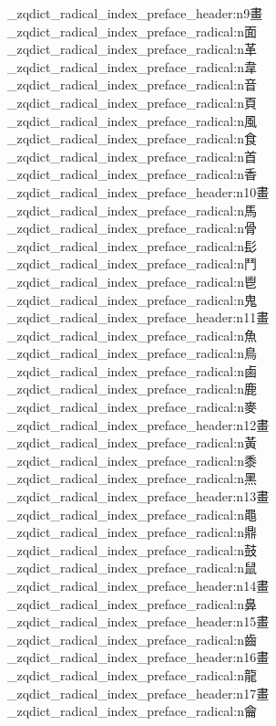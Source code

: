 {\begin{multicols}{5}
  \_zqdict_radical_index_preface_header:n{9畫}
  \_zqdict_radical_index_preface_radical:n{面}
  \_zqdict_radical_index_preface_radical:n{革}
  \_zqdict_radical_index_preface_radical:n{韋}
  \_zqdict_radical_index_preface_radical:n{音}
  \_zqdict_radical_index_preface_radical:n{頁}
  \_zqdict_radical_index_preface_radical:n{風}
  \_zqdict_radical_index_preface_radical:n{食}
  \_zqdict_radical_index_preface_radical:n{首}
  \_zqdict_radical_index_preface_radical:n{香}
  \_zqdict_radical_index_preface_header:n{10畫}
  \_zqdict_radical_index_preface_radical:n{馬}
  \_zqdict_radical_index_preface_radical:n{骨}
  \_zqdict_radical_index_preface_radical:n{髟}
  \_zqdict_radical_index_preface_radical:n{鬥}
  \_zqdict_radical_index_preface_radical:n{鬯}
  \_zqdict_radical_index_preface_radical:n{鬼}
  \_zqdict_radical_index_preface_header:n{11畫}
  \_zqdict_radical_index_preface_radical:n{魚}
  \_zqdict_radical_index_preface_radical:n{鳥}
  \_zqdict_radical_index_preface_radical:n{鹵}
  \_zqdict_radical_index_preface_radical:n{鹿}
  \_zqdict_radical_index_preface_radical:n{麥}
  \_zqdict_radical_index_preface_header:n{12畫}
  \_zqdict_radical_index_preface_radical:n{黃}
  \_zqdict_radical_index_preface_radical:n{黍}
  \_zqdict_radical_index_preface_radical:n{黑}
  \_zqdict_radical_index_preface_header:n{13畫}
  \_zqdict_radical_index_preface_radical:n{黽}
  \_zqdict_radical_index_preface_radical:n{鼎}
  \_zqdict_radical_index_preface_radical:n{鼓}
  \_zqdict_radical_index_preface_radical:n{鼠}
  \_zqdict_radical_index_preface_header:n{14畫}
  \_zqdict_radical_index_preface_radical:n{鼻}
  \_zqdict_radical_index_preface_header:n{15畫}
  \_zqdict_radical_index_preface_radical:n{齒}
  \_zqdict_radical_index_preface_header:n{16畫}
  \_zqdict_radical_index_preface_radical:n{龍}
  \_zqdict_radical_index_preface_header:n{17畫}
  \_zqdict_radical_index_preface_radical:n{龠}
  \end{multicols}
  \setlength{\columnsep}{0.25em}
  \setlength{\columnseprule}{0.4pt}
  \begin{multicols}{8}\small
  }{
  \end{multicols}
}

